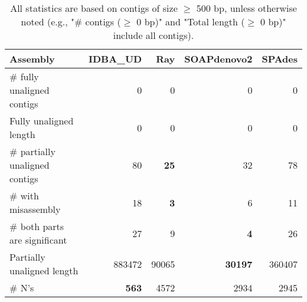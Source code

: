 \documentclass[12pt,a4paper]{article}
\begin{document}
\begin{table}[ht]
\begin{center}
\caption{All statistics are based on contigs of size $\geq$ 500 bp, unless otherwise noted (e.g., "\# contigs ($\geq$ 0 bp)" and "Total length ($\geq$ 0 bp)" include all contigs).}
\begin{tabular}{|l*{4}{|r}|}
\hline
Assembly & IDBA\_UD & Ray & SOAPdenovo2 & SPAdes \\ \hline
\# fully unaligned contigs & 0 & 0 & 0 & 0 \\ \hline
Fully unaligned length & 0 & 0 & 0 & 0 \\ \hline
\# partially unaligned contigs & 80 & {\bf 25} & 32 & 78 \\ \hline
\hspace{5mm}\# with misassembly & 18 & {\bf 3} & 6 & 11 \\ \hline
\hspace{5mm}\# both parts are significant & 27 & 9 & {\bf 4} & 26 \\ \hline
Partially unaligned length & 883472 & 90065 & {\bf 30197} & 360407 \\ \hline
\# N's & {\bf 563} & 4572 & 2934 & 2945 \\ \hline
\end{tabular}
\end{center}
\end{table}
\end{document}
